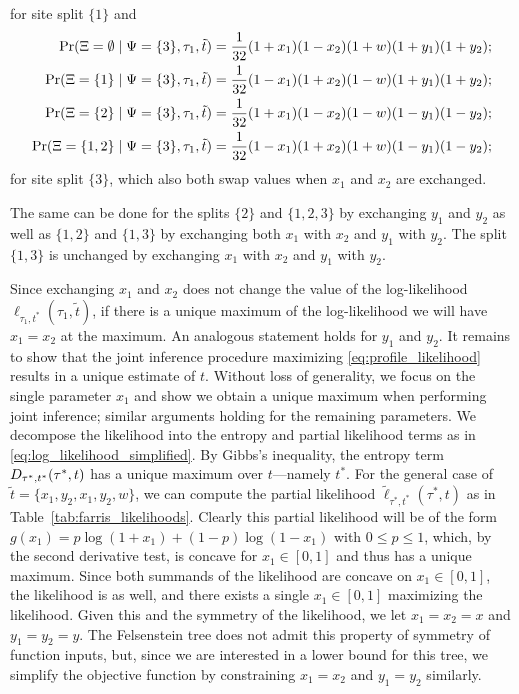 for site split $\{1\}$ and
\begin{align*}
        \Pr(\Xi=\emptyset \mid \Psi=\{3\}, \tau_1, \tilde{t}) &= \frac{1}{32}(1+x_1)(1-x_2)(1+w)(1+y_1)(1+y_2); \\
    \Pr(\Xi=\{1\} \mid \Psi=\{3\}, \tau_1, \tilde{t}) &= \frac{1}{32}(1-x_1)(1+x_2)(1-w)(1+y_1)(1+y_2); \\
    \Pr(\Xi=\{2\} \mid \Psi=\{3\}, \tau_1, \tilde{t}) &= \frac{1}{32}(1+x_1)(1-x_2)(1-w)(1-y_1)(1-y_2); \\
    \Pr(\Xi=\{1,2\} \mid \Psi=\{3\}, \tau_1, \tilde{t}) &= \frac{1}{32}(1-x_1)(1+x_2)(1+w)(1-y_1)(1-y_2);
\end{align*}
for site split $\{3\}$, which also both swap values when $x_1$ and $x_2$ are exchanged.

The same can be done for the splits $\{2\}$ and $\{1,2,3\}$ by exchanging $y_1$ and $y_2$ as well as $\{1,2\}$ and $\{1,3\}$ by exchanging both $x_1$ with $x_2$ and $y_1$ with $y_2$.
The split $\{1,3\}$ is unchanged by exchanging $x_1$ with $x_2$ and $y_1$ with $y_2$.

Since exchanging $x_1$ and $x_2$ does not change the value of the log-likelihood $\ell_{\tau_1,t^*}(\tau_1, \tilde{t})$, if there is a unique maximum of the log-likelihood we will have $x_1=x_2$ at the maximum.
An analogous statement holds for $y_1$ and $y_2$.
It remains to show that the joint inference procedure maximizing \eqref{eq:profile_likelihood} results in a unique estimate of $t$.
Without loss of generality, we focus on the single parameter $x_1$ and show we obtain a unique maximum when performing joint inference; similar arguments holding for the remaining parameters.
We decompose the likelihood into the entropy and partial likelihood terms as in \eqref{eq:log_likelihood_simplified}.
By Gibbs's inequality, the entropy term $D_{\tau^*,t^*}(\tau^*,t)$ has a unique maximum over $t$---namely $t^*$.
For the general case of $\tilde{t}=\{x_1, y_2, x_1, y_2, w\}$, we can compute the partial likelihood $\tilde{\ell}_{\tau^*,t^*}(\tau^*, t)$ as in Table~\ref{tab:farris_likelihoods}.
Clearly this partial likelihood will be of the form $g(x_1) = p\log(1+x_1) + (1-p)\log(1-x_1)$ with $0 \le p \le 1$, which, by the second derivative test, is concave for $x_1\in[0,1]$ and thus has a unique maximum.
Since both summands of the likelihood are concave on $x_1\in[0,1]$, the likelihood is as well, and there exists a single $x_1\in[0,1]$ maximizing the likelihood.
Given this and the symmetry of the likelihood, we let $x_1=x_2=x$ and $y_1=y_2=y$.
The Felsenstein tree does not admit this property of symmetry of function inputs, but, since we are interested in a lower bound for this tree, we simplify the objective function by constraining $x_1=x_2$ and $y_1=y_2$ similarly.

